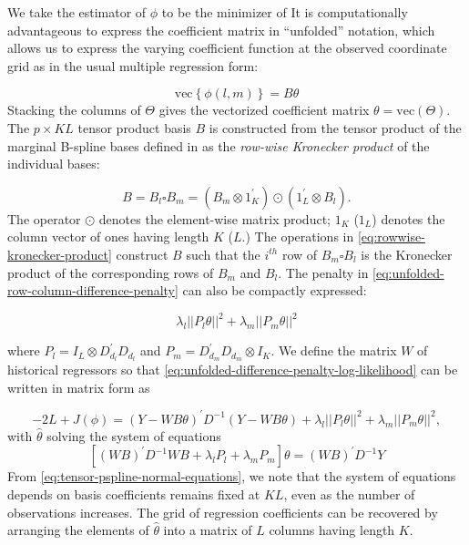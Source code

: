 \documentclass[12pt]{article}
\newcommand{\ms}{\scriptscriptstyle}
\theoremstyle{definition}
\begin{document}
\noindent
We take the estimator of $\phi$ to be the minimizer of 
It is computationally advantageous to express the coefficient matrix in ``unfolded'' notation, which allows us to express the varying coefficient function at the observed coordinate grid as in the usual multiple regression form:

\begin{equation*}
\mbox{vec}\left\{\phi\left(l,m\right)\right\} = B \theta
\end{equation*}
\noindent
Stacking the columns of $\Theta$ gives the vectorized coefficient matrix $\theta = \mbox{vec}\left( \Theta \right)$. The $p \times KL$ tensor product basis $B$ is constructed from the tensor product of the marginal B-spline bases defined in \citet{eilers2006fast} as the \textit{row-wise Kronecker product} of the individual bases:

\begin{equation} \label{eq:rowwise-kronecker-product}
B = B_l \square B_m = \left( B_m \otimes 1^\prime_{K} \right) \odot \left(1^\prime_{L} \otimes  B_l  \right).
\end{equation}
\noindent
The operator $\odot$ denotes the element-wise matrix product; $1_K$ ($1_L$) denotes the column vector of ones having length $K$ ($L$.) The operations in \ref{eq:rowwise-kronecker-product} construct $B$ such that the $i^{th}$ row of $B_m\square B_l$ is the Kronecker product of the corresponding rows of $B_m$ and $B_l$. The penalty in \ref{eq:unfolded-row-column-difference-penalty} can also be compactly expressed:

\begin{equation*} \label{eq:tensor-product-penalty}
\lambda_l \vert \vert P_l \theta \vert \vert^2 + \lambda_m \vert \vert P_m \theta \vert\vert^2
\end{equation*}

where $P_l = I_L \otimes D_{d_{\ms l}}^\prime D_{d_{\ms l}} $ and $P_m =  D_{d_{\ms m}}^\prime D_{d_{\ms m}} \otimes I_K$. We define the matrix $W$ of historical regressors so that \ref{eq:unfolded-difference-penalty-log-likelihood} can be written in matrix form as

\begin{equation} \label{eq:tensor-pspline-objective-function}
-2L + J\left(\phi\right) = \left( Y - WB\theta\right)^\prime D^{-1}\left( Y - WB\theta\right)  + \lambda_l \vert\vert P_l \theta \vert\vert^2 + \lambda_m \vert\vert P_m \theta\vert \vert^2,
\end{equation}
\noindent
with $\hat{\theta}$ solving the system of equations 
\begin{equation} \label{eq:tensor-pspline-normal-equations}
\left[ \left(WB\right)^\prime D^{-1} WB +  \lambda_l P_l+ \lambda_m P_m\right]\theta = \left(W B\right)^\prime D^{-1}Y
\end{equation}
\noindent
From \ref{eq:tensor-pspline-normal-equations}, we note that the system of equations depends on basis coefficients remains fixed at $KL$, even as the number of observations increases.   The grid of regression coefficients can be recovered by arranging the elements of $\hat{\theta}$ into a matrix of $L$ columns having length $K$. 
\end{document}
